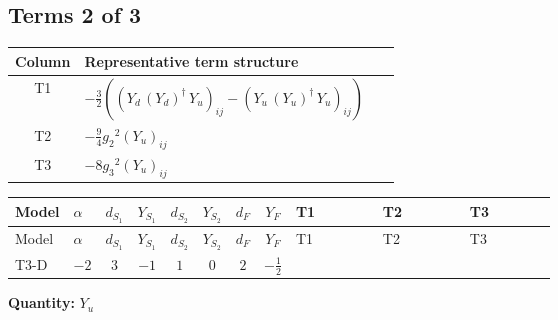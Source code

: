 \documentclass[8pt]{article}
\begin{document}
\begin{landscape}
\subsection*{Terms 2 of 3}
\begin{center}
\begin{tabular}{@{}c >{\raggedright\arraybackslash}p{0.82\linewidth}@{}}
\toprule
Column & Representative term structure \\
\midrule
T1 & \(\displaystyle -\frac{3}{2} (\left({Y_d}\,\left({Y_d}\right)^{\dagger}\,{Y_u}\right)_{ij}-\left({Y_u}\,\left({Y_u}\right)^{\dagger}\,{Y_u}\right)_{ij})\) \\
\midrule
T2 & \(\displaystyle -\frac{9}{4} {g_2}^2 \left({Y_u}\right)_{ij}\) \\
\midrule
T3 & \(\displaystyle -8 {g_3}^2 \left({Y_u}\right)_{ij}\) \\
\midrule
\bottomrule
\end{tabular}
\end{center}
\smallskip
\tiny
\begin{longtable}{@{}llcccccc >{\raggedright\arraybackslash}p{0.21\linewidth} >{\raggedright\arraybackslash}p{0.21\linewidth} >{\raggedright\arraybackslash}p{0.21\linewidth}@{}}
\toprule
Model & $\alpha$ & $d_{S_1}$ & $Y_{S_1}$ & $d_{S_2}$ & $Y_{S_2}$ & $d_F$ & $Y_F$ & T1 & T2 & T3 \\
\midrule
\endfirsthead
\toprule
Model & $\alpha$ & $d_{S_1}$ & $Y_{S_1}$ & $d_{S_2}$ & $Y_{S_2}$ & $d_F$ & $Y_F$ & T1 & T2 & T3 \\
\midrule
\endhead
T3-D & $-2$ & $3$ & $-1$ & $1$ & $0$ & $2$ & $-\frac{1}{2}$ & \scriptsize\adjustbox{max width=\linewidth}{$\begin{gathered} -\frac{3}{2} (\left({Y_d}\,\left({Y_d}\right)^{\dagger}\,{Y_u}\right)_{ij}-\left({Y_u}\,\left({Y_u}\right)^{\dagger}\,{Y_u}\right)_{ij})\end{gathered}$} & \scriptsize\adjustbox{max width=\linewidth}{$\begin{gathered} -\frac{9}{4} {g_2}^2 \left({Y_u}\right)_{ij}\end{gathered}$} & \scriptsize\adjustbox{max width=\linewidth}{$\begin{gathered} -8 {g_3}^2 \left({Y_u}\right)_{ij}\end{gathered}$} \\
\midrule
\bottomrule
\end{longtable}
\clearpage
\noindent\textbf{Quantity: }$Y_u$\par\smallskip

\end{landscape}
\end{document}
